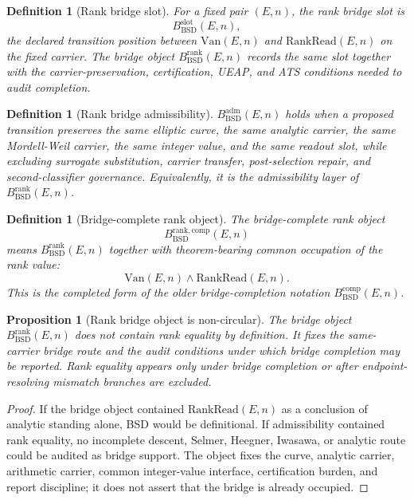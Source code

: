 \documentclass[11pt]{article}
\newtheorem{proposition}[theorem]{Proposition}
\newtheorem{definition}[theorem]{Definition}
\newcommand{\BSD}{\mathrm{BSD}}
\newcommand{\Van}{\mathrm{Van}}
\newcommand{\RankRead}{\mathrm{RankRead}}
\newcommand{\BsdRankBridge}{B^{\mathrm{rank}}_{\BSD}}
\newcommand{\BsdRankBridgeComp}{B^{\mathrm{rank,comp}}_{\BSD}}
\newcommand{\slot}{\mathrm{slot}}
\newcommand{\adm}{\mathrm{adm}}
\newcommand{\comp}{\mathrm{comp}}
\begin{document}
\begin{definition}[Rank bridge slot]
For a fixed pair $(E,n)$, the rank bridge slot is
\[
B^{\slot}_{\BSD}(E,n),
\]
the declared transition position between $\Van(E,n)$ and $\RankRead(E,n)$ on the fixed carrier. The bridge object $\BsdRankBridge(E,n)$ records the same slot together with the carrier-preservation, certification, UEAP, and ATS conditions needed to audit completion.
\end{definition}

\begin{definition}[Rank bridge admissibility]
$B^{\adm}_{\BSD}(E,n)$ holds when a proposed transition preserves the same elliptic curve, the same analytic carrier, the same Mordell-Weil carrier, the same integer value, and the same readout slot, while excluding surrogate substitution, carrier transfer, post-selection repair, and second-classifier governance. Equivalently, it is the admissibility layer of $\BsdRankBridge(E,n)$.
\end{definition}

\begin{definition}[Bridge-complete rank object]\label{def:rank-bridge-complete-object}
The bridge-complete rank object
\[
\BsdRankBridgeComp(E,n)
\]
means $\BsdRankBridge(E,n)$ together with theorem-bearing common occupation of the rank value:
\[
\Van(E,n)\wedge \RankRead(E,n).
\]
This is the completed form of the older bridge-completion notation $B^{\comp}_{\BSD}(E,n)$.
\end{definition}

\begin{proposition}[Rank bridge object is non-circular]\label{prop:rank-bridge-noncircular}
The bridge object $\BsdRankBridge(E,n)$ does not contain rank equality by definition. It fixes the same-carrier bridge route and the audit conditions under which bridge completion may be reported. Rank equality appears only under bridge completion or after endpoint-resolving mismatch branches are excluded.
\end{proposition}

\begin{proof}
If the bridge object contained $\RankRead(E,n)$ as a conclusion of analytic standing alone, BSD would be definitional. If admissibility contained rank equality, no incomplete descent, Selmer, Heegner, Iwasawa, or analytic route could be audited as bridge support. The object fixes the curve, analytic carrier, arithmetic carrier, common integer-value interface, certification burden, and report discipline; it does not assert that the bridge is already occupied.
\end{proof}
\end{document}

